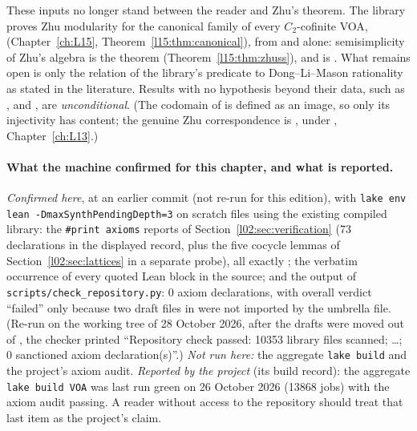 These inputs no longer stand between the reader and Zhu's theorem. The library proves Zhu modularity for the
canonical family of every $C_2$-cofinite  VOA,
\allowbreak{}\allowbreak{}\allowbreak{} (Chapter~\ref{ch:L15}, Theorem~\ref{l15:thm:canonical}), from  and
 alone: semisimplicity of Zhu's algebra is the theorem
\allowbreak{}\allowbreak{} (Theorem~\ref{l15:thm:zhuss}), and
\lean{[Finite (Φ W)]} is . What remains open is only the relation of the
library's predicate  to Dong--Li--Mason rationality as stated in the literature.
Results with no hypothesis beyond their data, such as ,  and
\allowbreak{}, are \emph{unconditional}. (The codomain of
\allowbreak{} is defined as an image, so only its injectivity has content; the
genuine Zhu correspondence is \allowbreak{}, under ,
Chapter~\ref{ch:L13}.)

\paragraph{What the machine confirmed for this chapter, and what is reported.} \emph{Confirmed here}, at
an earlier commit (not re-run for this edition), with \texttt{lake env lean -DmaxSynthPendingDepth=3} on scratch files using the
existing compiled library: the \texttt{\#print axioms} reports of Section~\ref{l02:sec:verification}
(73 declarations in the displayed record, plus the five cocycle lemmas of Section~\ref{l02:sec:lattices}
in a separate probe), all exactly ; the verbatim occurrence
of every quoted Lean block in the source; and the output of \texttt{scripts/check\_repository.py}: 0 axiom
declarations, with overall verdict ``failed'' only because two draft files in  were not
imported by the umbrella file. (Re-run on the working tree of 28 October 2026, after the drafts were moved out
of , the checker printed ``Repository check passed: 10353 library files scanned; \ldots;
0 sanctioned axiom declaration(s)''.) \emph{Not run here:} the aggregate \texttt{lake build} and the project's axiom
audit. \emph{Reported by the project} (its build record): the aggregate
\texttt{lake build VOA} was last run green on 26 October 2026 (13868 jobs) with the axiom audit passing.
A reader without access to the repository should treat that last item as the project's claim.

